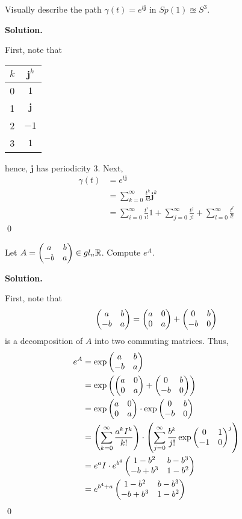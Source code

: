 \documentclass[12pt]{book}
\theoremstyle{definition}
\newenvironment{solution}
{%
  \par\noindent\textbf{Solution.}\quad
}
{%
  \qed\par
}
\begin{document}
\begin{taggedexercise}[\textcolor{yellow}{WIP}]
  Visually describe the path $\gamma(t) = e^{t\mathbf{j}}$ in $Sp(1) \approxeq S^3$.
\end{taggedexercise}

\begin{solution}
  First, note that
  \begin{table}[ht]
    \centering
    \begin{tabular}{c|c}

    $k$ & $\mathbf{j}^k$  \\ 
    \hline
    0 & $1$ \\
    1 & $\mathbf{j}$ \\
    2 & $-1$ \\
    3 & $1$ \\
    \end{tabular}
    \end{table}

  hence, $\mathbf{j}$ has periodicity $3$.
  Next,
  \[
  \begin{aligned}
    \gamma(t) &= e^{t\mathbf{j}} \\
              &= \sum_{k=0}^\infty \frac{t^k}{k!} \mathbf{j}^k\\
              &= \sum_{i=0}^\infty \frac{t^i}{i!}1 + \sum_{j=0}^\infty \frac{t^j}{j!} + \sum_{l=0}^\infty \frac{t^l}{l!}
  \end{aligned}
  \]  
\end{solution}

\begin{taggedexercise}[\textcolor{yellow}{WIP}]
  Let $A = \begin{pmatrix} a & b \\ -b & a \end{pmatrix} \in gl_n{\mathbb{R}}$.
  Compute $e^A$.
\end{taggedexercise}

\begin{solution}
  First, note that
  \[
    \begin{pmatrix} a & b \\ -b & a \end{pmatrix} = \begin{pmatrix} a & 0 \\ 0 & a \end{pmatrix} + \begin{pmatrix} 0 & b \\ -b & 0 \end{pmatrix}
  \]
  is a decomposition of $A$ into two commuting matrices.
  Thus,
  \[
  \begin{aligned}
    e^A &= \exp{ \begin{pmatrix} a & b \\ -b & a \end{pmatrix} } \\
        &= \exp\left({\begin{pmatrix} a & 0 \\ 0 & a \end{pmatrix} + \begin{pmatrix} 0 & b \\ -b & 0 \end{pmatrix}}\right) \\
        &= \exp\begin{pmatrix} a & 0 \\ 0 & a \end{pmatrix} \cdot \exp\begin{pmatrix} 0 & b \\ -b & 0 \end{pmatrix} \\
        &= \left(\sum_{k=0}^\infty \frac{a^kI^k}{k!} \right) \cdot \left(\sum_{j=0}^\infty \frac{b^k}{j!}\exp\begin{pmatrix} 0 & 1 \\ -1 & 0 \end{pmatrix}^j\right) \\
        &= e^{a}I \cdot e^{b^4}\begin{pmatrix} 1-b^2 & b-b^3 \\ -b+b^3 & 1-b^2 \end{pmatrix} \\
        &= e^{b^4 + a}\begin{pmatrix} 1-b^2 & b-b^3 \\ -b+b^3 & 1-b^2 \end{pmatrix}
  \end{aligned}
  \]
\end{solution}
\end{document}
